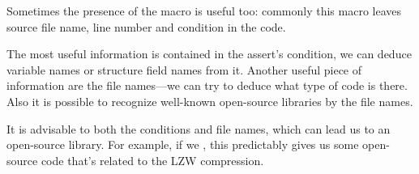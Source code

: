 
Sometimes the presence of the  macro is useful too: 
commonly this macro leaves source file name, line number and condition in the code.

The most useful information is contained in the assert's condition, we can deduce variable names or structure field
names from it. Another useful piece of information are the file names---we can try to deduce what type of
code is there.
Also it is possible to recognize well-known open-source libraries by the file names.



It is advisable to  both the conditions and file names, which can lead us to an open-source library.
For example, if we  , this predictably 
gives us some open-source code that's related to the LZW compression.
